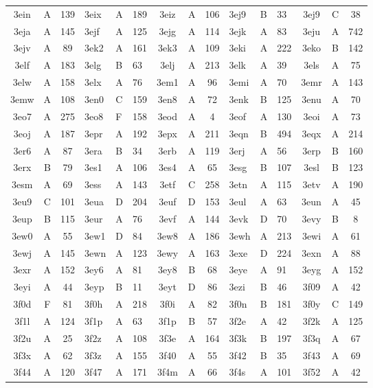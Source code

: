 \begin{longtable}{|c|c|c| a|a|a| c|c|c| a|a|a| c|c|c|}
3ein & A & 139 & 3eix & A & 189 & 3eiz & A & 106 & 3ej9 & B & 33 & 3ej9 & C & 38\\
3eja & A & 145 & 3ejf & A & 125 & 3ejg & A & 114 & 3ejk & A & 83 & 3eju & A & 742\\
3ejv & A & 89 & 3ek2 & A & 161 & 3ek3 & A & 109 & 3eki & A & 222 & 3eko & B & 142\\
3elf & A & 183 & 3elg & B & 63 & 3elj & A & 213 & 3elk & A & 39 & 3els & A & 75\\
3elw & A & 158 & 3elx & A & 76 & 3em1 & A & 96 & 3emi & A & 70 & 3emr & A & 143\\
3emw & A & 108 & 3en0 & C & 159 & 3en8 & A & 72 & 3enk & B & 125 & 3enu & A & 70\\
3eo7 & A & 275 & 3eo8 & F & 158 & 3eod & A & 4 & 3eof & A & 130 & 3eoi & A & 73\\
3eoj & A & 187 & 3epr & A & 192 & 3epx & A & 211 & 3eqn & B & 494 & 3eqx & A & 214\\
3er6 & A & 87 & 3era & B & 34 & 3erb & A & 119 & 3erj & A & 56 & 3erp & B & 160\\
3erx & B & 79 & 3es1 & A & 106 & 3es4 & A & 65 & 3esg & B & 107 & 3esl & B & 123\\
3esm & A & 69 & 3ess & A & 143 & 3etf & C & 258 & 3etn & A & 115 & 3etv & A & 190\\
3eu9 & C & 101 & 3eua & D & 204 & 3euf & D & 153 & 3eul & A & 63 & 3eun & A & 45\\
3eup & B & 115 & 3eur & A & 76 & 3evf & A & 144 & 3evk & D & 70 & 3evy & B & 8\\
3ew0 & A & 55 & 3ew1 & D & 84 & 3ew8 & A & 186 & 3ewh & A & 213 & 3ewi & A & 61\\
3ewj & A & 145 & 3ewn & A & 123 & 3ewy & A & 163 & 3exe & D & 224 & 3exn & A & 88\\
3exr & A & 152 & 3ey6 & A & 81 & 3ey8 & B & 68 & 3eye & A & 91 & 3eyg & A & 152\\
3eyi & A & 44 & 3eyp & B & 11 & 3eyt & D & 86 & 3ezi & B & 46 & 3f09 & A & 42\\
3f0d & F & 81 & 3f0h & A & 218 & 3f0i & A & 82 & 3f0n & B & 181 & 3f0y & C & 149\\
3f1l & A & 124 & 3f1p & A & 63 & 3f1p & B & 57 & 3f2e & A & 42 & 3f2k & A & 125\\
3f2u & A & 25 & 3f2z & A & 108 & 3f3e & A & 164 & 3f3k & B & 197 & 3f3q & A & 67\\
3f3x & A & 62 & 3f3z & A & 155 & 3f40 & A & 55 & 3f42 & B & 35 & 3f43 & A & 69\\
3f44 & A & 120 & 3f47 & A & 171 & 3f4m & A & 66 & 3f4s & A & 101 & 3f52 & A & 42\\

\end{longtable}
